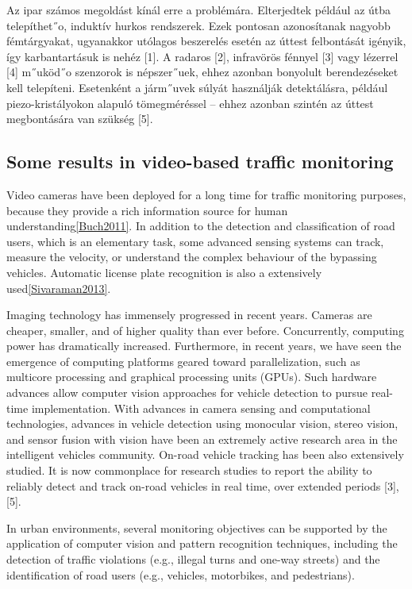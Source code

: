 Az ipar számos megoldást kínál erre a problémára. Elterjedtek például az útba telepíthet˝o,
induktív hurkos rendszerek. Ezek pontosan azonosítanak nagyobb fémtárgyakat, ugyanakkor utólagos
beszerelés esetén az úttest felbontását igényik, így karbantartásuk is nehéz [1]. A radaros [2],
infravörös fénnyel [3] vagy lézerrel [4] m˝uköd˝o szenzorok is népszer˝uek, ehhez azonban bonyolult
berendezéseket kell telepíteni. Esetenként a járm˝uvek súlyát használják detektálásra, például
piezo-kristályokon alapuló tömegméréssel – ehhez azonban szintén az úttest megbontására van
szükség [5].

\subsection{Some results in video-based traffic monitoring}
Video cameras have been deployed for a long time for traffic monitoring purposes, because they provide a rich information source for human understanding\ref{Buch2011}.
In addition to the detection and classification of road users, which is an elementary task, some advanced sensing systems can track, measure the velocity, or understand the complex behaviour of the bypassing vehicles.
Automatic license plate recognition is also a extensively used\ref{Sivaraman2013}. 

 Imaging technology has immensely progressed
in recent years. Cameras are cheaper, smaller, and of higher
quality than ever before. Concurrently, computing power has
dramatically increased. Furthermore, in recent years, we have
seen the emergence of computing platforms geared toward
parallelization, such as multicore processing and graphical processing
units (GPUs). Such hardware advances allow computer
vision approaches for vehicle detection to pursue real-time
implementation.
With advances in camera sensing and computational technologies,
advances in vehicle detection using monocular vision,
stereo vision, and sensor fusion with vision have been
an extremely active research area in the intelligent vehicles
community. On-road vehicle tracking has been also extensively
studied. It is now commonplace for research studies to report
the ability to reliably detect and track on-road vehicles in real
time, over extended periods [3], [5].


In urban environments, several monitoring objectives can
be supported by the application of computer vision and pattern
recognition techniques, including the detection of traffic
violations (e.g., illegal turns and one-way streets) and the
identification of road users (e.g., vehicles, motorbikes, and
pedestrians).


